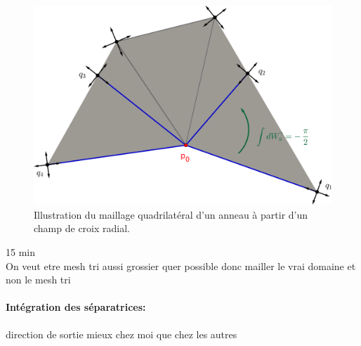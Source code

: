 \begin{figure}[!h]
\centering
\includegraphics[scale=0.755]{images/triangle separatrices bord.png}
\caption{Illustration du maillage quadrilatéral d'un anneau à partir d'un champ de croix radial.}
\label{fig:init_streams_bord}
\end{figure}



15 min\\
\color{red}
On veut etre mesh tri aussi grossier quer possible donc mailler le vrai domaine et non le mesh tri
\color{black}

\paragraph{Intégration des séparatrices:}


direction de sortie mieux chez moi que chez les autres

